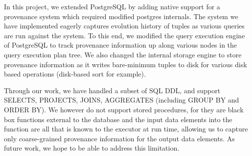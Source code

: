 In this project, we extended PostgreSQL by adding native support for a provenance system which required modified postgres internals. The system we have implemented eagerly captures evolution history of tuples as various queries are run against the system. To this end, we modified the query execution engine of PostgreSQL to track provenance information up along various nodes in the query execution plan tree. We also changed the internal storage engine to store provenance information as it writes bare-minimum tuples to disk for various disk based operations (disk-based sort for example).

Through our work, we have handled a subset of SQL DDL, and support SELECTS, PROJECTS, JOINS, AGGREGATES (including GROUP BY and ORDER BY).  We however do not support stored procedures, for they are black box functions external to the database and the input data elements into the function are all that is known to the executor at run time, allowing us to capture only coarse-grained provenance information for the output data elements. As future work, we hope to be able to address this limitation.